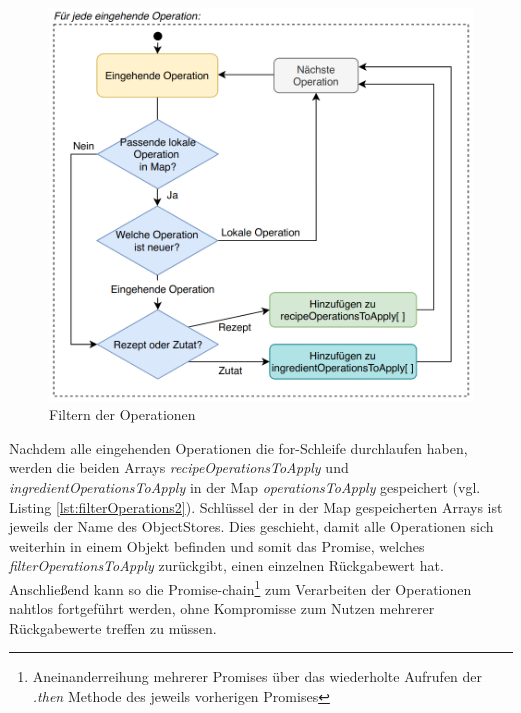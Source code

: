 \documentclass[a4paper, 12pt]{scrreprt}
\begin{document}
\begin{minipage}{\linewidth}
	
\end{minipage}

\begin{figure}[H]
	\centering
	\includegraphics[width=.80\textwidth]{flowchartFilterOperations.png}
	\caption{Filtern der Operationen}
	\label{fig:filterOperationsFlowchart}
\end{figure}

Nachdem alle eingehenden Operationen die for-Schleife durchlaufen haben, werden die beiden Arrays \textit{recipeOperationsToApply} und \textit{ingredientOperationsToApply} in der Map \textit{operationsToApply} gespeichert (vgl. Listing \ref{lst:filterOperations2}). Schlüssel der in der Map gespeicherten Arrays ist jeweils der Name des ObjectStores. Dies geschieht, damit alle Operationen sich weiterhin in einem Objekt befinden und somit das Promise, welches \textit{filterOperationsToApply} zurückgibt, einen einzelnen Rückgabewert hat. Anschließend kann so die Promise-chain\footnote{Aneinanderreihung mehrerer Promises über das wiederholte Aufrufen der \textit{.then} Methode des jeweils vorherigen Promises} zum Verarbeiten der Operationen nahtlos fortgeführt werden, ohne Kompromisse zum Nutzen mehrerer Rückgabewerte treffen zu müssen.

\begin{minipage}{\linewidth}
	
\end{minipage}
\end{document}
